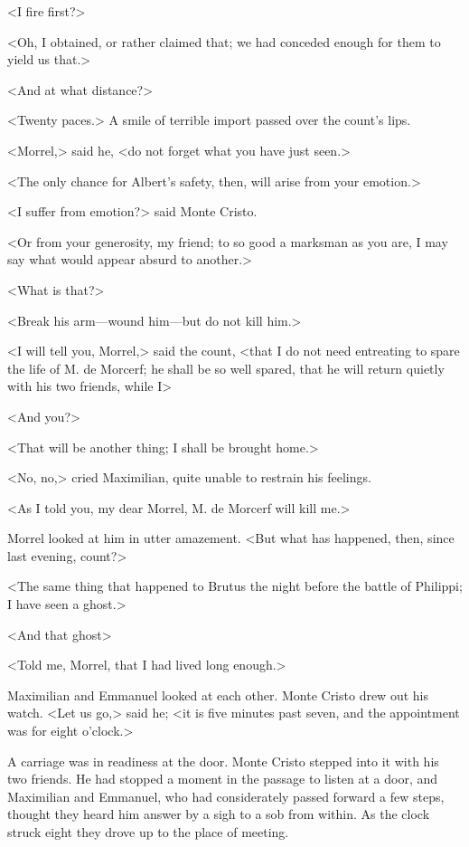  <I fire first?> 

 <Oh, I obtained, or rather claimed that; we had conceded enough for them to yield us that.> 

 <And at what distance?> 

 <Twenty paces.> A smile of terrible import passed over the count's lips. 

 <Morrel,> said he, <do not forget what you have just seen.> 

 <The only chance for Albert's safety, then, will arise from your emotion.> 

 <I suffer from emotion?> said Monte Cristo. 

 <Or from your generosity, my friend; to so good a marksman as you are, I may say what would appear absurd to another.> 

 <What is that?> 

 <Break his arm—wound him—but do not kill him.> 

 <I will tell you, Morrel,> said the count, <that I do not need entreating to spare the life of M. de Morcerf; he shall be so well spared, that he will return quietly with his two friends, while I\longdash> 

 <And you?> 

 <That will be another thing; I shall be brought home.> 

 <No, no,> cried Maximilian, quite unable to restrain his feelings. 

 <As I told you, my dear Morrel, M. de Morcerf will kill me.> 

 Morrel looked at him in utter amazement. <But what has happened, then, since last evening, count?> 

 <The same thing that happened to Brutus the night before the battle of Philippi; I have seen a ghost.> 

 <And that ghost\longdash> 

 <Told me, Morrel, that I had lived long enough.> 

 Maximilian and Emmanuel looked at each other. Monte Cristo drew out his watch. <Let us go,> said he; <it is five minutes past seven, and the appointment was for eight o'clock.> 

 A carriage was in readiness at the door. Monte Cristo stepped into it with his two friends. He had stopped a moment in the passage to listen at a door, and Maximilian and Emmanuel, who had considerately passed forward a few steps, thought they heard him answer by a sigh to a sob from within. As the clock struck eight they drove up to the place of meeting. 

